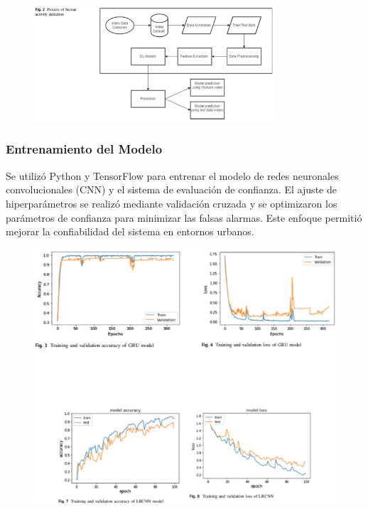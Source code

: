 \begin{figure}[h] %
    \centering
    \includegraphics[width=0.8\textwidth]{4/pro3.png} %
    \label{fig:ejemplo} %
\end{figure}



\subsubsection{Entrenamiento del Modelo}
Se utilizó Python y TensorFlow para entrenar el modelo de redes neuronales convolucionales (CNN) y el sistema de evaluación de confianza. El ajuste de hiperparámetros se realizó mediante validación cruzada y se optimizaron los parámetros de confianza para minimizar las falsas alarmas. Este enfoque permitió mejorar la confiabilidad del sistema en entornos urbanos.

\begin{figure}[h] %
    \centering
    \includegraphics[width=1.1\textwidth]{4/entre 3.png} %
    \label{fig:ejemplo} %
\end{figure}


